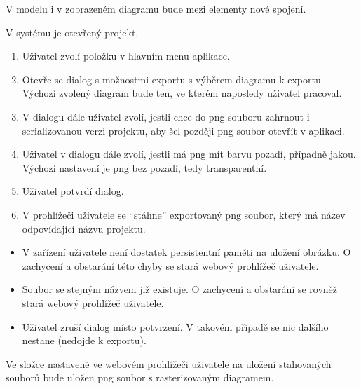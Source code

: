 \ucend{}
V modelu i v zobrazeném diagramu bude mezi elementy nové spojení.

\ucstart{}
V systému je otevřený projekt.

\ucnormal{}
\begin{enumerate}
  \item Uživatel zvolí položku  v hlavním menu aplikace.
  \item Otevře se dialog s možnostmi exportu s výběrem diagramu k exportu. Výchozí zvolený diagram bude ten, ve kterém naposledy uživatel pracoval.
  \item V dialogu dále uživatel zvolí, jestli chce do \acrshort{png} souboru zahrnout i serializovanou verzi projektu, aby šel později \acrshort{png} soubor otevřít v aplikaci.
  \item Uživatel v dialogu dále zvolí, jestli má \acrshort{png} mít barvu pozadí, případně jakou. Výchozí nastavení je \acrshort{png} bez pozadí, tedy transparentní.
  \item Uživatel potvrdí dialog.
  \item V prohlížeči uživatele se \enquote{stáhne} exportovaný \acrshort{png} soubor, který má název odpovídající názvu projektu.
\end{enumerate}

\ucerrors{}
\begin{itemize}
  \item V zařízení uživatele není dostatek persistentní paměti na uložení obrázku.
        O zachycení a obstarání této chyby se stará webový prohlížeč uživatele.
  \item Soubor se stejným názvem již existuje.
        O zachycení a obstarání se rovněž stará webový prohlížeč uživatele.
  \item Uživatel zruší dialog místo potvrzení. V takovém případě se nic dalšího nestane (nedojde k exportu).
\end{itemize}

\ucend{}
Ve složce nastavené ve webovém prohlížeči uživatele na uložení stahovaných souborů bude uložen \acrshort{png} soubor s rasterizovaným diagramem.
